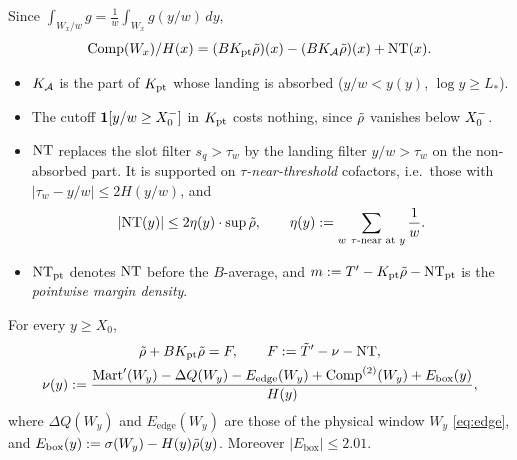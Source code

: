 Since $\int_{W_x/w}g=\frac1w\int_{W_x}g(y/w)\,dy$,
\[
  \mathrm{Comp}(W_x)/H(x)=(BK_{\mathrm{pt}}\tilde\rho)(x)-(BK_{\mathcal{A}}\tilde\rho)(x)+\mathrm{NT}(x).
\]
\begin{itemize}
\item $K_{\mathcal{A}}$ is the part of $K_{\mathrm{pt}}$ whose landing is absorbed ($y/w<y(y)$, $\log y\ge L_*$).
\item The cutoff $\mathbf 1[y/w\ge X_0^{-}]$ in $K_{\mathrm{pt}}$ costs nothing, since $\tilde\rho$ vanishes below $X_0^{-}$.
\item $\mathrm{NT}$ replaces the slot filter $s_q>\tau_w$ by the landing filter $y/w>\tau_w$ on the non-absorbed part. It is
  supported on \emph{$\tau$-near-threshold} cofactors, i.e.\ those with $|\tau_w-y/w|\le2H(y/w)$, and
  \begin{equation}\label{eq:NT}
    |\NT(y)|\le2\eta(y)\cdot\sup\rhot,\qquad\eta(y):=\sum_{w\ \tau\text{-near at }y}\frac1w .
  \end{equation}
\item $\mathrm{NT}_{\mathrm{pt}}$ denotes $\mathrm{NT}$ before the $B$-average, and $m:=T'-K_{\mathrm{pt}}\tilde\rho-\mathrm{NT}_{\mathrm{pt}}$ is the
  \emph{pointwise margin density}.
\end{itemize}

\begin{proposition}\label{prop:margin-identity}
For every $y\ge X_0$,
\begin{equation}\label{eq:margin-identity}
\begin{gathered}
  \tilde\rho+BK_{\mathrm{pt}}\tilde\rho=F,\qquad F:=\tilde T'-\nu-\mathrm{NT},\\
  \nu(y):=\frac{\mathrm{Mart}'(W_y)-\Delta Q(W_y)-E_{\mathrm{edge}}(W_y)+\mathrm{Comp}^{(2)}(W_y)+E_{\mathrm{box}}(y)}{H(y)},
\end{gathered}
\end{equation}
where $\Delta Q(W_y)$ and $E_{\mathrm{edge}}(W_y)$ are those of the physical window $W_y$ \eqref{eq:edge}, and
$E_{\mathrm{box}}(y):=\sigma(W_y)-H(y)\tilde\rho(y)$. Moreover $|E_{\mathrm{box}}|\le2.01$.
\end{proposition}

